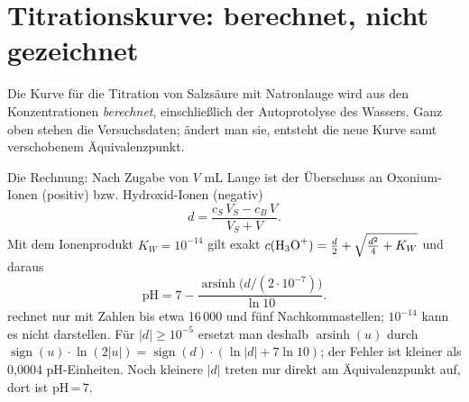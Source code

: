 \section{Titrationskurve: berechnet, nicht gezeichnet}

Die Kurve für die Titration von Salzsäure mit Natronlauge wird aus den Konzentrationen \textit{berechnet}, einschließlich der Autoprotolyse des Wassers. Ganz oben stehen die Versuchsdaten; ändert man sie, entsteht die neue Kurve samt verschobenem Äquivalenzpunkt.

Die Rechnung: Nach Zugabe von $V$ mL Lauge ist der Überschuss an Oxonium-Ionen (positiv) bzw. Hydroxid-Ionen (negativ)
\[
	d = \frac{c_S\,V_S - c_B\,V}{V_S + V} .
\]
Mit dem Ionenprodukt $K_W = 10^{-14}$ gilt exakt $c(\ce{H3O+}) = \frac d2 + \sqrt{\frac{d^2}{4} + K_W}$ und daraus
\[
	\mathrm{pH} = 7 - \frac{\operatorname{arsinh}\bigl(d / (2\cdot 10^{-7})\bigr)}{\ln 10}.
\]
\TikZ rechnet nur mit Zahlen bis etwa 16\,000 und fünf Nachkommastellen; $10^{-14}$ kann es nicht darstellen. Für $|d| \ge 10^{-5}$ ersetzt man deshalb $\operatorname{arsinh}(u)$ durch $\operatorname{sign}(u)\cdot\ln(2|u|) = \operatorname{sign}(d)\cdot(\ln|d| + 7\ln 10)$; der Fehler ist kleiner als 0,0004 pH-Einheiten. Noch kleinere $|d|$ treten nur direkt am Äquivalenzpunkt auf, dort ist pH\,=\,7.

